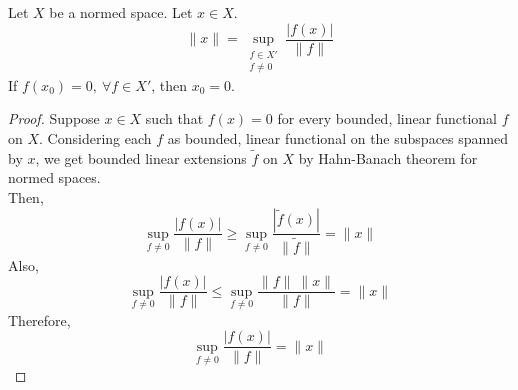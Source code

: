\begin{corollary}
	Let $X$ be a normed space.
	Let $x \in X$.
	\[ \|x\| = \sup_{\substack{f \in X'\\ f \ne 0}} \frac{|f(x)|}{\|f\|} \]
	If $f(x_0) = 0,\ \forall f \in X'$, then $x_0 = 0$.
\end{corollary}
\begin{proof}
	Suppose $x \in X$ such that $f(x) = 0$ for every bounded, linear functional $f$ on $X$.
	Considering each $f$ as bounded, linear functional on the subspaces spanned by $x$, we get bounded linear extensions $\tilde{f}$ on $X$ by Hahn-Banach theorem for normed spaces.	\\

	Then,
	\[ \sup_{f \ne 0} \frac{|f(x)|}{\|f\|} \ge \sup_{f \ne 0} \frac{|\tilde{f}(x)|}{\|\tilde{f}\|} = \|x\| \]
	Also,
	\[ \sup_{f \ne 0} \frac{|f(x)|}{\|f\|} \le \sup_{f \ne 0} \frac{\|f\| \ \|x\|}{\|f\|} = \|x\| \]
	Therefore, 
	\[ \sup_{f \ne 0} \frac{|f(x)|}{\|f\|} = \|x\| \]
\end{proof}

\setcounter{subsection}{4}
